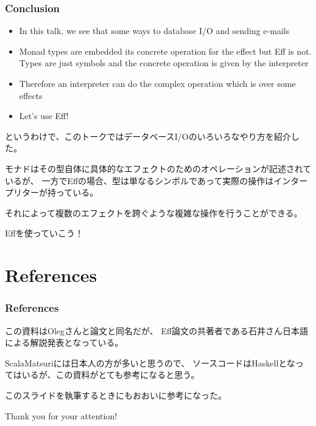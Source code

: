 \begin{frame}
  \frametitle{Conclusion}

  \pause
  \begin{itemize}
    \item<+-> In this talk,
    we see that some ways to database I/O and sending e-mails

    \item<+-> Monad types are embedded its concrete operation for the effect
    but Eff is not. Types are just symbols and the concrete operation is given
    by the interpreter

    \item<+-> Therefore an interpreter can do the complex operation
    which is over some effects
    
    \item<+-> Let's use Eff!
  \end{itemize}

  \begin{notes}
    \item というわけで、このトークではデータベースI/Oのいろいろなやり方を紹介した。

    \item モナドはその型自体に具体的なエフェクトのためのオペレーションが記述されているが、
    一方でEffの場合、型は単なるシンボルであって実際の操作はインタープリターが持っている。

    \item それによって複数のエフェクトを跨ぐような複雑な操作を行うことができる。

    \item Effを使っていこう！
  \end{notes}
\end{frame}

\section*{References}

\begin{frame}%
  \frametitle{References}

  \nocite{*}
  
  

  \begin{notes}
    \item この資料はOlegさんと論文と同名だが、
    Eff論文の共著者である石井さん日本語による解説発表となっている。

    \item ScalaMatsuriには日本人の方が多いと思うので、
    ソースコードはHaskellとなってはいるが、この資料がとても参考になると思う。

    \item このスライドを執筆するときにもおおいに参考になった。
  \end{notes}
\end{frame}

\begin{frame}
  \centering
  {\Huge Thank you for your attention!}
\end{frame}


